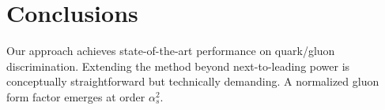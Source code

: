 \section{Conclusions}\label{sec:conclusions}

Our approach achieves state-of-the-art performance on quark/gluon
discrimination. Extending the method beyond next-to-leading power is
conceptually straightforward but technically demanding. A normalized
gluon form factor emerges at order $\alpha_s^2$.

